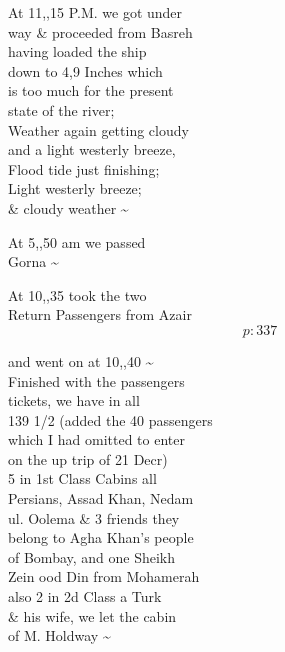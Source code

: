 \documentclass{report}
\begin{document}
	\par{
 	At 11,,15 P.M. we got under\ \\way \& proceeded from Basreh\ \\having loaded the ship\ \\down to 4,9 Inches which\ \\is too much for the present\ \\state of the river;\ \\Weather again getting cloudy\ \\and a light westerly breeze,\ \\Flood tide just finishing;\ \\Light westerly breeze;\ \\\& cloudy weather \~{}\ \\
	}

	\par{
 	At 5,,50 am we passed\ \\Gorna \~{}\ \\
	}

	\par{
 	At 10,,35 took the two\ \\Return Passengers from Azair\ \\
  \[p: 337 \]

	}




	\par{
 	and went on at 10,,40 \~{}\ \\Finished with the passengers\ \\tickets, we have in all\ \\139 1/2 (added the 40 passengers\ \\which I had omitted to enter\ \\on the up trip of 21 Decr)\ \\5 in 1st Class Cabins all\ \\Persians, Assad Khan, Nedam\ \\ul. Oolema \& 3 friends they\ \\belong to Agha Khan’s people\ \\of Bombay, and one Sheikh\ \\Zein ood Din from Mohamerah\ \\also 2 in 2d Class a Turk\ \\\& his wife, we let the cabin\ \\of M. Holdway \~{}\ \\
	}
\end{document}
